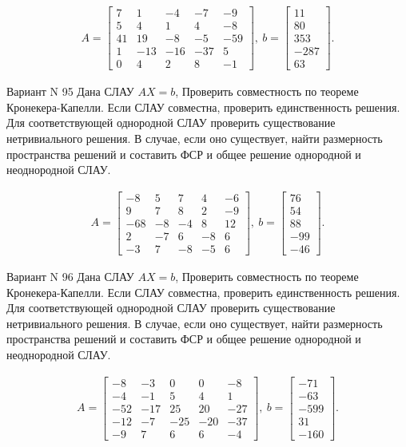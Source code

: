 \documentclass[11pt]{report}
\begin{document}
\begin{align*}
 A = \left[\begin{matrix}7 & 1 & -4 & -7 & -9\\5 & 4 & 1 & 4 & -8\\41 & 19 & -8 & -5 & -59\\1 & -13 & -16 & -37 & 5\\0 & 4 & 2 & 8 & -1\end{matrix}\right],
\ b = \left[\begin{matrix}11\\80\\353\\-287\\63\end{matrix}\right]. 
 \end{align*}

Вариант N 95
Дана СЛАУ $AX = b$,
Проверить совместность по теореме Кронекера-Капелли. Если СЛАУ совместна, проверить единственность решения.
Для соответствующей однородной СЛАУ проверить существование нетривиального решения. В случае, если оно существует,
найти размерность пространства решений и составить ФСР и общее решение однородной  и неоднородной СЛАУ.


\begin{align*}
 A = \left[\begin{matrix}-8 & 5 & 7 & 4 & -6\\9 & 7 & 8 & 2 & -9\\-68 & -8 & -4 & 8 & 12\\2 & -7 & 6 & -8 & 6\\-3 & 7 & -8 & -5 & 6\end{matrix}\right],
\ b = \left[\begin{matrix}76\\54\\88\\-99\\-46\end{matrix}\right]. 
 \end{align*}

Вариант N 96
Дана СЛАУ $AX = b$,
Проверить совместность по теореме Кронекера-Капелли. Если СЛАУ совместна, проверить единственность решения.
Для соответствующей однородной СЛАУ проверить существование нетривиального решения. В случае, если оно существует,
найти размерность пространства решений и составить ФСР и общее решение однородной  и неоднородной СЛАУ.


\begin{align*}
 A = \left[\begin{matrix}-8 & -3 & 0 & 0 & -8\\-4 & -1 & 5 & 4 & 1\\-52 & -17 & 25 & 20 & -27\\-12 & -7 & -25 & -20 & -37\\-9 & 7 & 6 & 6 & -4\end{matrix}\right],
\ b = \left[\begin{matrix}-71\\-63\\-599\\31\\-160\end{matrix}\right]. 
 \end{align*}
\end{document}
